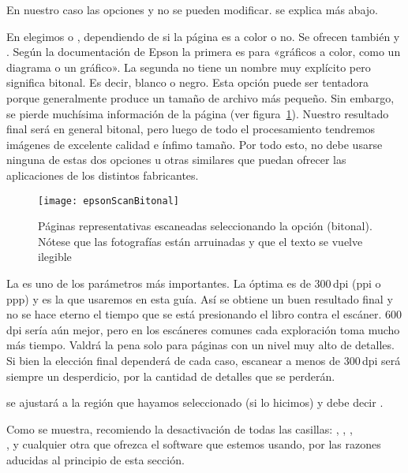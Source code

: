 \documentclass[%
	a5paper,
	10pt,
	twoside,
	openright,
	final,
]{memoir}
\begin{document}
	En nuestro caso las opciones  y  no se pueden modificar.  se explica más abajo.

	En  elegimos  o , dependiendo de si la página es a color o no. Se ofrecen también  y . Según la documentación de Epson la primera es para «gráficos a color, como un diagrama o un gráfico». La segunda no tiene un nombre muy explícito pero significa bitonal. Es decir, blanco o negro. Esta opción puede ser tentadora porque generalmente produce un tamaño de archivo más pequeño. Sin embargo, se pierde muchísima información de la página (ver figura~\ref{fig:epsonScanBitonal}). Nuestro resultado final será en general bitonal, pero luego de todo el procesamiento tendremos imágenes de excelente calidad e ínfimo tamaño. Por todo esto, no debe usarse ninguna de estas dos opciones u otras similares que puedan ofrecer las aplicaciones de los distintos fabricantes.

	\begin{figure}
		\texttt{[image: epsonScanBitonal]}
		\caption[Páginas representativas escaneadas en bitonal]{Páginas representativas escaneadas seleccionando la opción  (bitonal). Nótese que las fotografías están arruinadas y que el texto se vuelve ilegible\label{fig:epsonScanBitonal}}
	\end{figure}

	La  es uno de los parámetros más importantes. La óptima es de 300\,dpi (ppi o ppp) y es la que usaremos en esta guía. Así se obtiene un buen resultado final y no se hace eterno el tiempo que se está presionando el libro contra el escáner. 600\,dpi sería aún mejor, pero en los escáneres comunes cada exploración toma mucho más tiempo. Valdrá la pena solo para páginas con un nivel muy alto de detalles. Si bien la elección final dependerá de cada caso, escanear a menos de 300\,dpi será siempre un desperdicio, por la cantidad de detalles que se perderán.

	 se ajustará a la región que hayamos seleccionado (si lo hicimos) y  debe decir .

	Como se muestra, recomiendo la desactivación de todas las casillas: , , ,\\,  y cualquier otra que ofrezca el software que estemos usando, por las razones aducidas al principio de esta sección.
\end{document}
